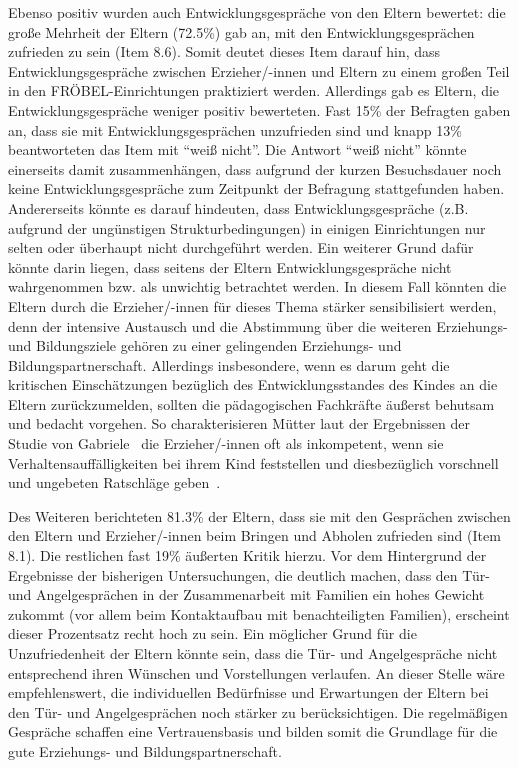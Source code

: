 \documentclass[12pt,a4paper]{article}
\begin{document}
	Ebenso positiv wurden auch Entwicklungsgespräche von den Eltern bewertet: die große Mehrheit der Eltern (72.5\%) gab an, mit den Entwicklungsgesprächen zufrieden zu sein (Item 8.6). Somit deutet dieses Item darauf hin, dass Entwicklungsgespräche zwischen Erzieher/-innen und Eltern zu einem großen Teil in den FRÖBEL-Einrichtungen praktiziert werden. Allerdings gab es Eltern, die Entwicklungsgespräche weniger positiv bewerteten. Fast 15\% der Befragten gaben an, dass sie mit Entwicklungsgesprächen unzufrieden sind und knapp 13\% beantworteten das Item mit "`weiß nicht"'. Die Antwort "`weiß nicht"' könnte einerseits damit zusammenhängen, dass aufgrund der kurzen Besuchsdauer noch keine Entwicklungsgespräche zum Zeitpunkt der Befragung stattgefunden haben. Andererseits könnte es darauf hindeuten, dass Entwicklungsgespräche (z.B. aufgrund der ungünstigen Strukturbedingungen) in einigen Einrichtungen nur selten oder überhaupt nicht durchgeführt werden. Ein weiterer Grund dafür könnte darin liegen, dass seitens der Eltern Entwicklungsgespräche nicht wahrgenommen bzw. als unwichtig betrachtet werden. In diesem Fall könnten die Eltern durch die Erzieher/-innen für dieses Thema stärker sensibilisiert werden, denn der intensive Austausch und die Abstimmung über die weiteren Erziehungs- und Bildungsziele gehören zu einer gelingenden Erziehungs- und Bildungspartnerschaft. Allerdings insbesondere, wenn es darum geht die kritischen Einschätzungen bezüglich des Entwicklungsstandes des Kindes an die Eltern zurückzumelden, sollten die pädagogischen Fachkräfte äußerst behutsam und bedacht vorgehen. So charakterisieren Mütter laut der Ergebnissen der Studie von Gabriele~\textcite{Peitz} die Erzieher/-innen oft als inkompetent, wenn sie Verhaltensauffälligkeiten bei ihrem Kind feststellen und diesbezüglich vorschnell und ungebeten Ratschläge geben~\parencite[S.~265-270]{Peitz}.
	
	Des Weiteren berichteten 81.3\% der Eltern, dass sie mit den Gesprächen zwischen den Eltern und Erzieher/-innen beim Bringen und Abholen zufrieden sind (Item 8.1). Die restlichen fast 19\% äußerten Kritik hierzu. Vor dem Hintergrund der Ergebnisse der bisherigen Untersuchungen, die deutlich machen, dass den Tür- und Angelgesprächen in der Zusammenarbeit mit Familien ein hohes Gewicht zukommt (vor allem beim Kontaktaufbau mit benachteiligten Familien), erscheint dieser Prozentsatz recht hoch zu sein. Ein möglicher Grund für die Unzufriedenheit der Eltern könnte sein, dass die Tür- und Angelgespräche nicht entsprechend ihren Wünschen und Vorstellungen verlaufen. An dieser Stelle wäre empfehlenswert, die individuellen Bedürfnisse und Erwartungen der Eltern bei den Tür- und Angelgesprächen noch stärker zu berücksichtigen. Die regelmäßigen Gespräche schaffen eine Vertrauensbasis und bilden somit die Grundlage für die gute Erziehungs- und Bildungspartnerschaft.
	
\end{document}

